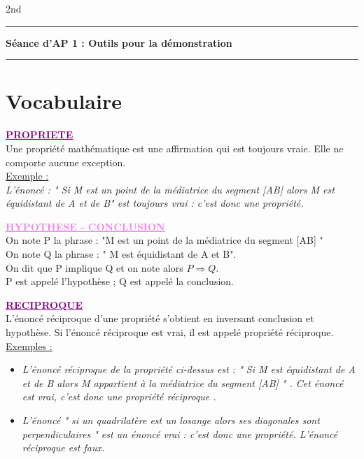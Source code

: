 \documentclass[a4paper,11pt]{article}
\newcommand{\bi}{\begin{itemize}}
\newcommand{\ei}{\end{itemize}}
\newcommand{\titre}[5] 
{
\noindent #2 \hfill #4 \\
#3 \hfill #5

\vspace{-1.6cm}

\begin{center}\rule{6cm}{0.5mm}\end{center}
\vspace{0.2cm}
\begin{center}{\Large{\textbf{#1}}}\end{center}
\begin{center}\rule{6cm}{0.5mm}\end{center}
}
\begin{document}
\pagestyle{empty}

\titre{Séance d'AP 1 : Outils pour la démonstration}{}{}{2nd}{}

\vspace*{0.2cm}

\section{Vocabulaire}



\textbf{\textcolor{purple}{\underline{PROPRIETE}}}\\
Une propriété mathématique est une affirmation qui est toujours vraie. Elle ne comporte aucune exception.\\

\underline{Exemple :}\\
\textit{L'énoncé : " Si M est un point de la médiatrice du segment [AB] alors M est équidistant de A et de B" est toujours vrai : c'est donc une propriété.}\\
\vspace*{0.5cm}

\textbf{\textcolor{violet}{\underline{HYPOTHESE - CONCLUSION}}}\\
On note P la phrase : "M est un point de la médiatrice du segment [AB] "\\
On note Q la phrase : " M est équidistant de A et B".\\
On dit que P implique Q et on note alors $P \Rightarrow Q$.\\
P est appelé l'hypothèse ; Q est appelé la conclusion.\\
\vspace*{0.5cm}

\textbf{\textcolor{purple}{\underline{RECIPROQUE}}}\\
L'énoncé réciproque d'une propriété s'obtient en inversant conclusion et hypothèse. Si l'énoncé réciproque est vrai, il est appelé propriété réciproque.\\

\underline{Exemples :}
\bi
\item \textit{L'énoncé réciproque de la propriété ci-dessus est : " Si M est équidistant de A et de B alors M appartient à la médiatrice du segment [AB] " . Cet énoncé est vrai, c’est donc une propriété réciproque .}
\item \textit{L'énoncé " si un quadrilatère est un losange alors ses diagonales sont perpendiculaires " est un énoncé vrai : c’est donc une propriété. L'énoncé réciproque est faux.}\\
\ei
\vspace*{0.5cm}
\end{document}
